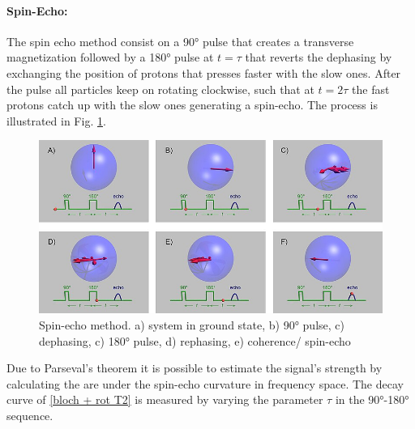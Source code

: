 \paragraph{Spin-Echo:}
The spin echo method consist on a 90° pulse that creates a transverse magnetization followed by a 180° pulse at $t = \tau$ that reverts the dephasing  by exchanging the position of protons that presses faster with the slow ones.  After the pulse all particles keep on rotating clockwise, such that at $t = 2\tau$ the fast protons catch up with the slow ones generating a spin-echo. The process is illustrated in Fig. \ref{fig: spin-echo}. 
\begin{figure}[!htbp]
 \begin{center}
  \includegraphics[width = .6\textwidth]{Latex images/SpinEcho_GWM_stills.jpg}
  \caption[]{Spin-echo method. a) system in ground state, b) 90° pulse, c) dephasing, c) 180° pulse, d) rephasing, e) coherence/ spin-echo  \footnotemark}
    \label{fig: spin-echo}
 \end{center}
\end{figure}
Due to Parseval's theorem it is possible to estimate the signal's strength by calculating the are under the spin-echo curvature in frequency space.
The decay curve of \ref{bloch + rot T2} is measured by varying the parameter $\tau$ in the 90°-180° sequence.

